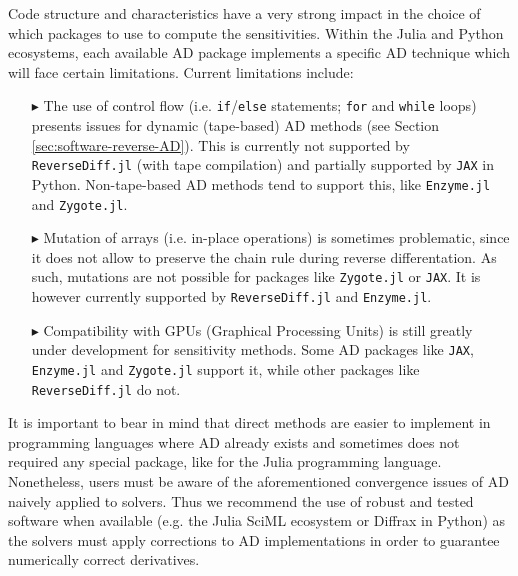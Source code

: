Code structure and characteristics have a very strong impact in the choice of which packages to use to compute the sensitivities. 
Within the Julia and Python ecosystems, each available AD package implements a specific AD technique which will face certain limitations.
Current limitations include:
\begin{enumerate}
    \item[$ \blacktriangleright$] The use of control flow (i.e. \texttt{if}/\texttt{else} statements; \texttt{for} and \texttt{while} loops) presents issues for dynamic (tape-based) AD methods (see Section \ref{sec:software-reverse-AD}). 
    This is currently not supported by \texttt{ReverseDiff.jl} (with tape compilation) and partially supported by \texttt{JAX} in Python. 
    Non-tape-based AD methods tend to support this, like \texttt{Enzyme.jl} and \texttt{Zygote.jl}.
    \item[$ \blacktriangleright$] Mutation of arrays (i.e. in-place operations) is sometimes problematic, since it does not allow to preserve the chain rule during reverse differentation. As such, mutations are not possible for packages like \texttt{Zygote.jl} or \texttt{JAX}. It is however currently supported by \texttt{ReverseDiff.jl} and \texttt{Enzyme.jl}.
    \item[$ \blacktriangleright$] Compatibility with GPUs (Graphical Processing Units) is still greatly under development for sensitivity methods. 
    Some AD packages like \texttt{JAX}, \texttt{Enzyme.jl} and \texttt{Zygote.jl} support it, while other packages like \texttt{ReverseDiff.jl} do not. 
\end{enumerate}

It is important to bear in mind that direct methods are easier to implement in programming languages where AD already exists and sometimes does not required any special package, like for the Julia programming language.
Nonetheless, users must be aware of the aforementioned convergence issues of AD naively applied to solvers. 
Thus we recommend the use of robust and tested software when available (e.g. the Julia SciML ecosystem or Diffrax in Python) as the solvers must apply corrections to AD implementations in order to guarantee numerically correct derivatives.

